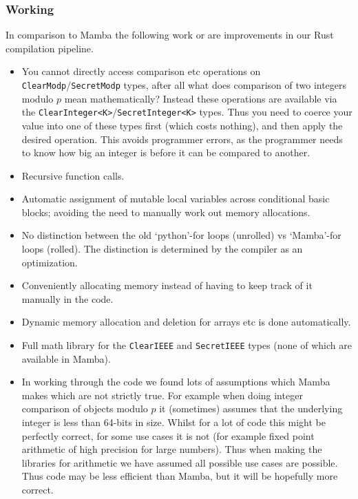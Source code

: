 \subsubsection{Working}
In comparison to Mamba the following work or are improvements
in our Rust compilation pipeline.
\begin{itemize}
     \item You cannot directly access comparison etc operations on 
	     \verb|ClearModp|/\verb|SecretModp| types, after all what
	      does comparison of two integers modulo $p$ mean mathematically?
	      Instead these operations are available via the
	      \verb|ClearInteger<K>|/\verb|SecretInteger<K>| types.
	      Thus you need to coerce your value into one of these
	      types first (which costs nothing), and then apply 
	      the desired operation. This avoids programmer errors,
	      as the programmer needs to know how big an integer is
	      before it can be compared to another.
     \item Recursive function calls.
     \item Automatic assignment of mutable local variables across
	     conditional basic blocks; avoiding the need to manually
	     work out memory allocations.
     \item No distinction between the old `python'-for loops (unrolled)
	     vs `Mamba'-for loops (rolled). The distinction is determined
	   by the compiler as an optimization.
     \item Conveniently allocating memory instead of having to keep 
	   track of it manually in the code.
     \item Dynamic memory allocation and deletion for arrays etc is done 
	     automatically.
     \item Full math library for the \verb|ClearIEEE| and \verb|SecretIEEE|
	     types (none of which are available in Mamba).
     \item In working through the code we found lots of assumptions which
	     Mamba makes which are not strictly true. For example when doing
	     integer comparison of objects modulo $p$ it (sometimes) assumes that the
	     underlying integer is less than 64-bits in size.
	     Whilst for a lot of code this might be perfectly correct, for 
	     some use cases it is not (for example fixed point arithmetic
	     of high precision for large numbers). Thus when making the libraries for
	     arithmetic we have assumed all possible use cases are possible.
	     Thus code may be less efficient than Mamba, but it will be hopefully
	     more correct.
\end{itemize}


